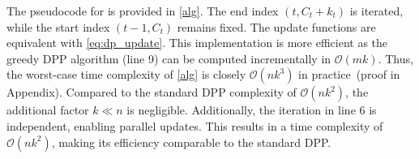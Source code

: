 The pseudocode for \mname{} is provided in \cref{alg}.
The end index \((t, C_t + k_t)\) is iterated, while the start index \((t-1, C_t)\) remains fixed.
The update functions are equivalent with \cref{eq:dp_update}.
This implementation is more efficient as the greedy DPP algorithm (line 9) can be computed incrementally in $\mathcal{O}(mk)$.
Thus, the worst-case time complexity of \cref{alg} is closely \(\mathcal{O}(nk^3)\) in practice~(proof in Appendix).
Compared to the standard DPP complexity of \(\mathcal{O}(nk^2)\), the additional factor \(k \ll n\) is negligible. 
Additionally, the iteration in line 6 is independent, enabling parallel updates.
This results in a time complexity of \(\mathcal{O}(nk^2)\), making its efficiency comparable to the standard DPP.




